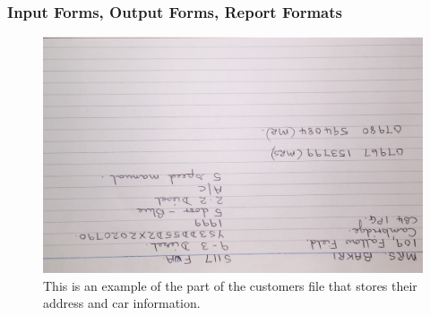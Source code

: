 \documentclass{article}
\begin{document}
	\subsubsection{Input Forms, Output Forms, Report Formats}
	
		\begin{figure}[H]
	
	
	
	  \includegraphics[width=\textwidth]{image_1.jpeg}
    \caption{This is an example of the part of the customers file that stores their address and car information.}
    

\end{figure}
\end{document}

